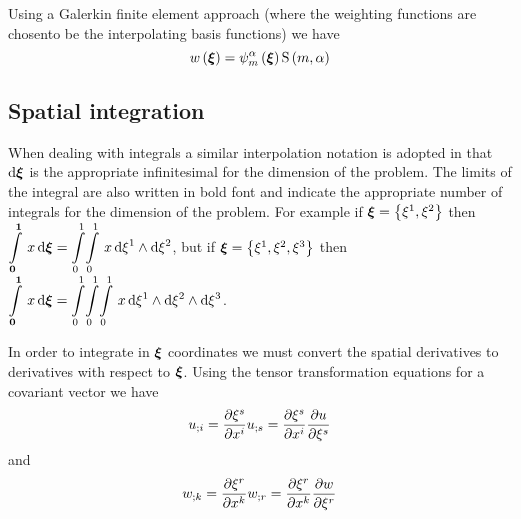Using a Galerkin finite element approach (where the weighting functions are
chosento be the interpolating basis functions) we have 
\begin{equation}
   w\left(  \boldsymbol{\xi}  \right) =   \psi_{m}^{\alpha} \left(  \boldsymbol{\xi}  \right)     \mathrm{S} \left( m,\alpha \right)  
\end{equation}

\subsection{Spatial integration}

When dealing with integrals a similar interpolation notation is adopted in
that $  { \mathrm{d} } \boldsymbol{\xi}   $ is the appropriate infinitesimal for the dimension of the
problem. The limits of the integral are also written in bold font and indicate
the appropriate number of integrals for the dimension of the problem.  For
example if $ \boldsymbol{\xi} =\left\{ \xi^{1},\xi^{2} \right\}$ then
$\gint{\vectr{0}}{\vectr{1}}{x}
{\vectr{\xi}}=\giint{0}{1}{0}{1}{x}{\xione}{\xitwo}$,
but if $ \boldsymbol{\xi} =\left\{ \xi^{1},\xi^{2},\xi^{3} \right\}$ then 
$\gint{\vectr{0}}{\vectr{1}}{x}{\vectr{\xi}}=
\dintl{0}{1}\!\dintl{0}{1}\!\dintl{0}{1}\,\threeform{x}{\xione}{\xitwo}{\xithree}$.

In order to integrate in $ \boldsymbol{\xi} $ coordinates we must convert the spatial
derivatives to derivatives with respect to $ \boldsymbol{\xi} $. Using the tensor
transformation equations for a covariant vector we have
\begin{equation}  
   {u}_{;i} = \dfrac{\partial \xi^{s}}{\partial x^{i}}  {u}_{;s} =
   \dfrac{\partial \xi^{s}}{\partial x^{i}}  \dfrac{\partial u}{\partial \xi^{s}} 
\end{equation}
and 
\begin{equation}
   {w}_{;k} = \dfrac{\partial \xi^{r}}{\partial x^{k}}  {w}_{;r} =
   \dfrac{\partial \xi^{r}}{\partial x^{k}}  \dfrac{\partial w}{\partial \xi^{r}} 
\end{equation}

